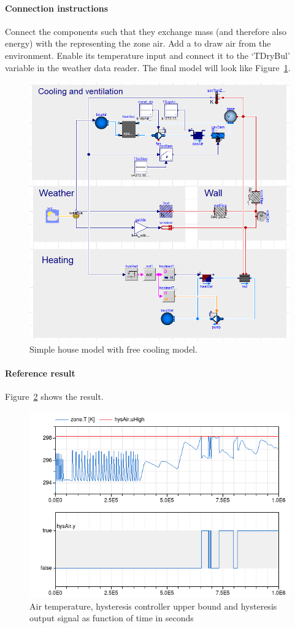 \documentclass[10pt,a4paper]{article}
\begin{document}
\paragraph{Connection instructions}
Connect the components such that they exchange mass 
(and therefore also energy) with the 
representing the zone air.
Add a  to draw air from the environment.
Enable its temperature input and connect it to the `TDryBul'
variable in the weather data reader. The final model will look like
Figure~\ref{fig:freeCoolingModel}.

\begin{figure}[h!]
\centering
\includegraphics[scale=0.5]{freeCoolingModel.png}
\caption{Simple house model with free cooling model.}
\label{fig:freeCoolingModel}
\end{figure} 


\paragraph{Reference result}
Figure~\ref{fig:res6} shows the result.



\begin{figure}
\centering
\includegraphics[scale=0.7]{result6.png}
\caption{Air temperature, hysteresis controller upper bound and hysteresis output signal as function of time in seconds}
\label{fig:res6}
\end{figure}
\end{document}
